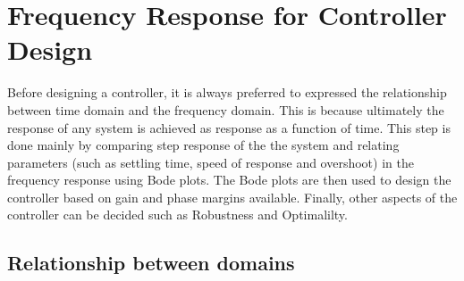\chapter{Frequency Response for Controller Design}

Before designing a controller, it is always preferred to expressed the relationship between time domain and the frequency domain. This is because ultimately the response of any system is achieved as response as a function of time. This step is done mainly by comparing step response of the the system and relating parameters (such as settling time, speed of response and overshoot) in the frequency response using Bode plots. The Bode plots are then used to design the controller based on gain and phase margins available. Finally, other aspects of the controller can be decided such as Robustness and Optimalilty.

\section{Relationship between domains} \label{Sec_RelationshipFrReTiRe}

